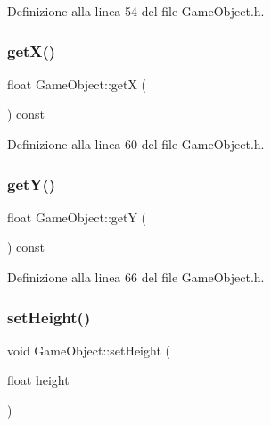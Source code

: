 Definizione alla linea 54 del file Game\+Object.\+h.

\mbox{\label{class_game_object_abe61df236efb58849b29d242d87fc59f}} 
\subsubsection{\texorpdfstring{get\+X()}{getX()}}
{\footnotesize\ttfamily float Game\+Object\+::getX (\begin{DoxyParamCaption}{ }\end{DoxyParamCaption}) const\hspace{0.3cm}{\ttfamily [inline]}}



Definizione alla linea 60 del file Game\+Object.\+h.

\mbox{\label{class_game_object_a3f55728263b9ce2407459d14b9861b04}} 
\subsubsection{\texorpdfstring{get\+Y()}{getY()}}
{\footnotesize\ttfamily float Game\+Object\+::getY (\begin{DoxyParamCaption}{ }\end{DoxyParamCaption}) const\hspace{0.3cm}{\ttfamily [inline]}}



Definizione alla linea 66 del file Game\+Object.\+h.

\mbox{\label{class_game_object_acaaf4a9eb1f8a86341619948608535d3}} 
\subsubsection{\texorpdfstring{set\+Height()}{setHeight()}}
{\footnotesize\ttfamily void Game\+Object\+::set\+Height (\begin{DoxyParamCaption}\item[{float}]{height }\end{DoxyParamCaption})\hspace{0.3cm}{\ttfamily [inline]}}



